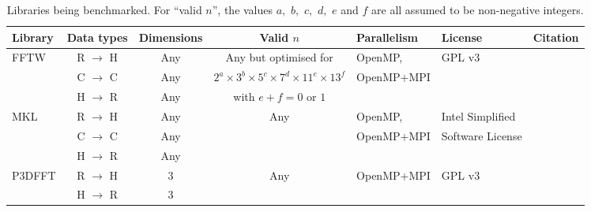 \documentclass[a4paper]{article}
\begin{document}
\begin{table}[h]
\begin{center}
\begin{small}
\begin{tabular}{|l|c|c|c|l|l|c|}
\hline
\textbf{Library} & \textbf{Data types} & \textbf{Dimensions} & \textbf{Valid $n$} & \textbf{Parallelism} & \textbf{License} & \textbf{Citation} \\ \hline
FFTW & R $\rightarrow$ H & Any   & Any but optimised for  & OpenMP, & GPL v3 & \cite{FFTW} \\
     & C $\rightarrow$ C & Any      & $2^a\times 3^b\times 5^c\times 7^d\times 11^e\times 13^f$ &  OpenMP+MPI & & \\
     & H $\rightarrow$ R & Any      & with $e+f = 0$ or $1$ & & & \\ \hline
MKL  & R $\rightarrow$ H & Any   & Any & OpenMP, & Intel Simplified & \cite{MKL} \\
     & C $\rightarrow$ C & Any      & & OpenMP+MPI & Software License & \\
     & H $\rightarrow$ R & Any   & & & & \\ \hline
P3DFFT & R $\rightarrow$ H & 3   & Any & OpenMP+MPI & GPL v3 & \cite{P3DFFT} \\
     & H $\rightarrow$ R & 3   & & & & \\ \hline

\end{tabular}
\caption{Libraries being benchmarked.  For ``valid $n$'', the values $a,$ $b,$ $c,$ $d,$ $e$ and $f$ are all assumed to be non-negative integers.}\label{Tbl:libs}
\end{small}
\end{center}
\end{table}
\end{document}
